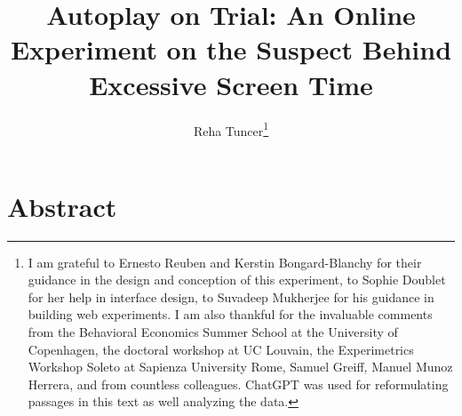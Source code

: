 \documentclass[11pt,a4paper,oneside]{article}
\title{Autoplay on Trial: An Online Experiment on the Suspect Behind Excessive Screen Time
}
\author{Reha Tuncer\footnote{I am grateful to Ernesto Reuben and Kerstin Bongard-Blanchy for their guidance in the design and conception of this experiment, to Sophie Doublet for her help in interface design, to Suvadeep Mukherjee for his guidance in building web experiments. I am also thankful for the invaluable comments from the Behavioral Economics Summer School at the University of Copenhagen, the doctoral workshop at UC Louvain, the Experimetrics Workshop Soleto at Sapienza University Rome, Samuel Greiff, Manuel Munoz Herrera, and from countless colleagues. ChatGPT was used for reformulating passages in this text as well analyzing the data.}}
\begin{document}
\maketitle








\section*{Abstract}
\end{document}
